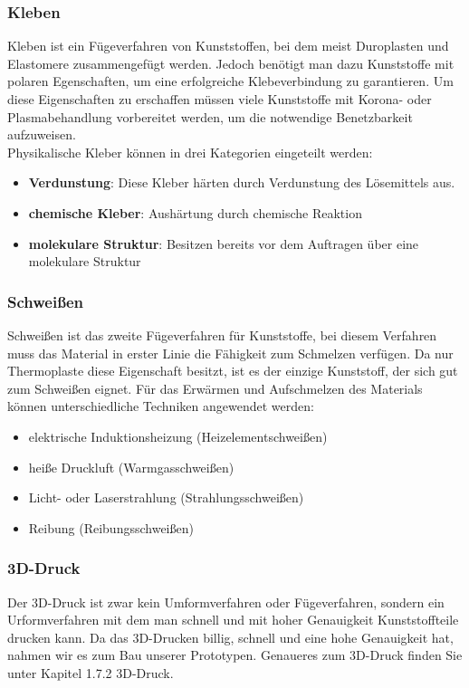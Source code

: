 \subsubsection{Kleben}
Kleben ist ein Fügeverfahren von Kunststoffen, bei dem meist Duroplasten und Elastomere zusammengefügt werden.
Jedoch benötigt man dazu Kunststoffe mit polaren Egenschaften, um eine erfolgreiche Klebeverbindung zu garantieren.
Um diese Eigenschaften zu erschaffen müssen viele Kunststoffe mit Korona- oder Plasmabehandlung vorbereitet werden,
um die notwendige Benetzbarkeit aufzuweisen.\\
Physikalische Kleber können in drei Kategorien eingeteilt werden:
\begin{itemize}
    \item \textbf{Verdunstung}: Diese Kleber härten durch Verdunstung des Lösemittels aus.
    \item \textbf{chemische Kleber}: Aushärtung durch chemische Reaktion
    \item \textbf{molekulare Struktur}: Besitzen bereits vor dem Auftragen über eine molekulare Struktur
\end{itemize}

\subsubsection{Schweißen}
Schweißen ist das zweite Fügeverfahren für Kunststoffe, bei diesem Verfahren muss das Material in erster Linie die
Fähigkeit zum Schmelzen verfügen. Da nur Thermoplaste diese Eigenschaft besitzt, ist es der einzige Kunststoff, der sich gut
zum Schweißen eignet. Für das Erwärmen und Aufschmelzen des Materials können unterschiedliche Techniken angewendet werden:
\begin{itemize}
    \item elektrische Induktionsheizung (Heizelementschweißen)
    \item heiße Druckluft (Warmgasschweißen)
    \item Licht- oder Laserstrahlung (Strahlungsschweißen)
    \item Reibung (Reibungsschweißen)
\end{itemize}

\subsubsection{3D-Druck}
Der 3D-Druck ist zwar kein Umformverfahren oder Fügeverfahren, sondern ein Urformverfahren mit dem man schnell und mit hoher Genauigkeit Kunststoffteile
drucken kann. Da das 3D-Drucken billig, schnell und eine hohe Genauigkeit hat, nahmen wir es zum Bau unserer Prototypen. Genaueres zum 3D-Druck finden
Sie unter Kapitel 1.7.2 3D-Druck.

